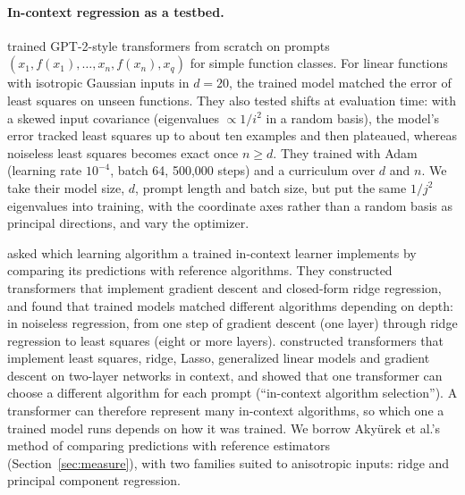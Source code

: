 \paragraph{In-context regression as a testbed.} \citet{garg2022} trained GPT-2-style transformers from scratch on prompts $(x_1, f(x_1), \dots, x_n, f(x_n), x_q)$ for simple function classes. For linear functions with isotropic Gaussian inputs in $d = 20$, the trained model matched the error of least squares on unseen functions. They also tested shifts at evaluation time: with a skewed input covariance (eigenvalues $\propto 1/i^2$ in a random basis), the model's error tracked least squares up to about ten examples and then plateaued, whereas noiseless least squares becomes exact once $n \ge d$. They trained with Adam (learning rate $10^{-4}$, batch 64, 500,000 steps) and a curriculum over $d$ and $n$. We take their model size, $d$, prompt length and batch size, but put the same $1/j^2$ eigenvalues into training, with the coordinate axes rather than a random basis as principal directions, and vary the optimizer.

\citet{akyurek2023} asked which learning algorithm a trained in-context learner implements by comparing its predictions with reference algorithms. They constructed transformers that implement gradient descent and closed-form ridge regression, and found that trained models matched different algorithms depending on depth: in noiseless regression, from one step of gradient descent (one layer) through ridge regression to least squares (eight or more layers). \citet{bai2023} constructed transformers that implement least squares, ridge, Lasso, generalized linear models and gradient descent on two-layer networks in context, and showed that one transformer can choose a different algorithm for each prompt (``in-context algorithm selection''). A transformer can therefore represent many in-context algorithms, so which one a trained model runs depends on how it was trained. We borrow Akyürek et al.'s method of comparing predictions with reference estimators (Section~\ref{sec:measure}), with two families suited to anisotropic inputs: ridge and principal component regression.

